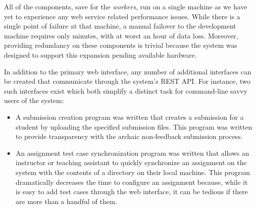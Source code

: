 All of the components, save for the \emph{workers}, run on a single machine as
we have yet to experience any web service related performance issues. While
there is a single point of failure at that machine, a manual failover to the
development machine requires only minutes, with at worst an hour of data
loss. Moreover, providing redundancy on these components is trivial because the
system was designed to support this expansion pending available hardware.

In addition to the primary web interface, any number of additional interfaces
can be created that communicate through the system's REST API. For instance,
two such interfaces exist which both simplify a distinct task for command-line
savvy users of the system:

\begin{itemize}
\item A submission creation program was written that creates a submission for a
  student by uploading the specified submission files. This program was written
  to provide transparency with the archaic non-feedback submission process.
\item An assignment test case synchronization program was written that allows
  an instructor or teaching assistant to quickly synchronize an assignment on
  the system with the contents of a directory on their local machine. This
  program dramatically decreases the time to configure an assignment because,
  while it is easy to add test cases through the web interface, it can be
  tedious if there are more than a handful of them.
\end{itemize}

